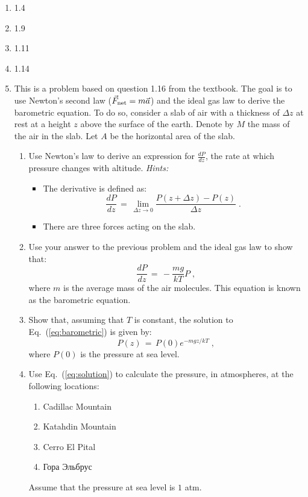 \documentclass[12pt]{article}
\begin{document}
\begin{enumerate}
\setlength{\itemsep}{-1mm}
  \item 1.4
  \item 1.9
  \item 1.11
  \item 1.14
  \item This is a problem based on question 1.16 from the textbook.
    The goal is to use Newton's second law ($\vec{F}_{\rm net} =
    m\vec{a}$) and the ideal gas law to derive the barometric
    equation.  To do so, consider a slab of air with a thickness of
    $\Delta z$ at rest at a height $z$ above the surface of the earth.
    Denote by $M$ the mass of the air in the slab.  Let $A$ be the
    horizontal area of the slab.  
    \begin{enumerate}
    \item Use Newton's law to derive an expression for
      $\frac{dP}{dz}$, the rate at which pressure changes with
      altitude.  \emph{Hints:}
      \begin{itemize}
      \item The derivative is defined as:
        \begin{equation}
          \frac{dP}{dz} \, = \, \lim_{\Delta z \rightarrow 0}
          \frac{P(z+\Delta z) - P(z)}{\Delta z} \;.
        \end{equation}
      \item There are three forces acting on the slab.
      \end{itemize}
      \item Use your answer to the previous problem and the ideal gas
        law to show that:
        \begin{equation}
          \frac{dP}{dz} \, = \, -\frac{mg}{kT}P \;,
          \label{eq:barometric}
          \end{equation}
        where $m$ is the average mass of the air molecules.  This
        equation is known as the barometric equation.
      \item Show that, assuming that $T$ is constant, the solution to
        Eq.~(\ref{eq:barometric}) is given by:
        \begin{equation}
          P(z) \, = \, P(0) e^{-mgz/kT} \;,
          \label{eq:solution}
          \end{equation}
        where $P(0)$ is the pressure at sea level.
      \item Use Eq.~(\ref{eq:solution}) to calculate the pressure, in
        atmospheres, at the following locations:
        \begin{enumerate}
        \item Cadillac Mountain
        \item Katahdin Mountain
        \item Cerro El Pital
        \item Гора Эльбрус
        \end{enumerate}
        Assume that the pressure at sea level is $1$ atm. 
    \end{enumerate}

\end{enumerate}
\end{document}

